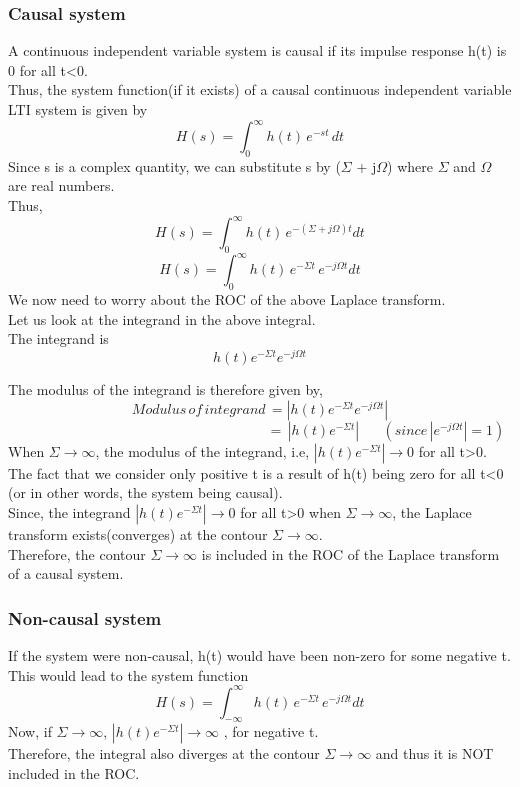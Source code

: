 \subsubsection{Causal system}
A continuous independent variable system is causal if its impulse response h(t) is 0 for all t<0. \\
Thus, the system function(if it exists) of a causal continuous independent variable LTI system is given by
\[ H(s) =  \int_0^\infty h(t)\, e^{-st}\, dt \]
Since s is a complex quantity, we can substitute s by ($\Sigma$ + j$\Omega$) where $\Sigma$ and $\Omega$ are real numbers.\\
Thus,
\[ H(s) =  \int_0^\infty h(t)\, e^{-({\Sigma +j\Omega })t}dt \]
\[ H(s) =  \int_0^\infty h(t)\, e^{-{\Sigma}t}\, e^{-j\Omega t}dt\]
We now need to worry about the ROC of the above Laplace transform.\\
Let us look at the integrand in the above integral. \\
The integrand is \[h(t) e^{-\Sigma t} e^{-j\Omega t}\]

The modulus of the integrand is therefore given by,\\
\[Modulus\, of\, integrand\, =  |h(t) e^{-\Sigma t} e^{-j\Omega t}|\]
\[ \quad \quad \quad \quad \quad \quad \quad \quad \quad \quad \quad \quad \quad \quad \quad \quad \quad \quad   = \, |h(t) e^{-\Sigma t}|\,\,\,\,\,\,\,\,\,\,(since\, |e^{-j\Omega t}|=1)\]                 
When $\Sigma \rightarrow \infty$, the modulus of the integrand, i.e, $|h(t) e^{-\Sigma t}| \rightarrow 0$ for all t>0.\\
The fact that we consider only positive t is a result of h(t) being zero for all t<0 (or in other words, the system being causal).\\
Since, the integrand $|h(t) e^{-\Sigma t}| \rightarrow  0$ for all t>0 when $\Sigma \rightarrow  \infty$, the Laplace transform exists(converges) at the contour $\Sigma \rightarrow \infty$.\\

Therefore, the contour $\Sigma \rightarrow \infty$ is included in the ROC of the Laplace transform of a causal system.
\subsubsection{Non-causal system}
If the system were non-causal, h(t) would have been non-zero for some negative t. This would lead to the system function 
\[ H(s) =  \int_{-\infty }^\infty h(t)\, e^{-{\Sigma}t}\, e^{-j\Omega t}dt\]
Now, if $\Sigma \rightarrow \infty$, $|h(t) e^{-\Sigma t}| \rightarrow \infty$ , for negative t. \\
Therefore, the integral also diverges at the contour  $\Sigma \rightarrow \infty $ and thus it is NOT included in the ROC.
